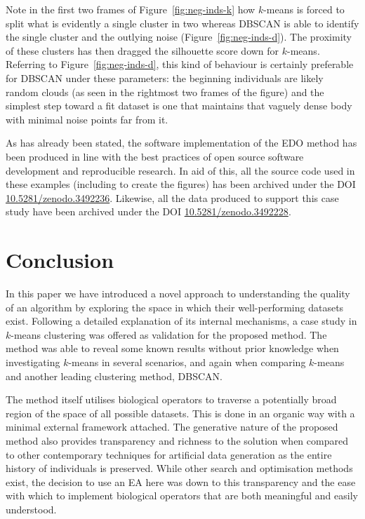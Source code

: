 Note in the first two frames of Figure~\ref{fig:neg-inds-k} how \(k\)-means is
forced to split what is evidently a single cluster in two whereas DBSCAN is able
to identify the single cluster and the outlying noise
(Figure~\ref{fig:neg-inds-d}). The proximity of these clusters has then dragged
the silhouette score down for \(k\)-means. Referring to
Figure~\ref{fig:neg-inds-d}, this kind of behaviour is certainly preferable for
DBSCAN under these parameters: the beginning individuals are likely random
clouds (as seen in the rightmost two frames of the figure) and the simplest step
toward a fit dataset is one that maintains that vaguely dense body with minimal
noise points far from it.

As has already been stated, the software implementation of the EDO method has
been produced in line with the best practices of open source software
development and reproducible research. In aid of this, all the source code used
in these examples (including to create the figures) has been archived under the
DOI \href{https://doi.org/10.5281/zenodo.3492236}{10.5281/zenodo.3492236}.
Likewise, all the data produced to support this case study have been archived
under the DOI
\href{https://doi.org/10.5281/zenodo.3492228}{10.5281/zenodo.3492228}.


\section{Conclusion}

In this paper we have introduced a novel approach to understanding the quality
of an algorithm by exploring the space in which their well-performing datasets
exist. Following a detailed explanation of its internal mechanisms, a case study
in \(k\)-means clustering was offered as validation for the proposed method.
The method was able to reveal some known results without prior knowledge when
investigating \(k\)-means in several scenarios, and again when comparing
\(k\)-means and another leading clustering method, DBSCAN.\

The method itself utilises biological operators to traverse a potentially broad
region of the space of all possible datasets. This is done in an organic way
with a minimal external framework attached. The generative nature of the
proposed method also provides transparency and richness to the solution when
compared to other contemporary techniques for artificial data generation as the
entire history of individuals is preserved. While other search and optimisation
methods exist, the decision to use an EA here was down to this transparency and
the ease with which to implement biological operators that are both meaningful
and easily understood.

